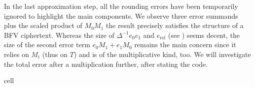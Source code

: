 \documentclass[letterpaper,10pt,english]{jupyterBook}
\begin{document}
\sphinxAtStartPar
In the last approximation step, all the rounding errors have been temporarily ignored to highlight the main components.
We observe three error summands plus the scaled product of \(M_0M_1\) \sphinxhyphen{} the result precisely satisfies the structure of a BFV ciphertext.
Whereas the size of \(\Delta^{-1}e_0e_1\) and \(e_{\text{rel}}\) (see {\hyperref[\detokenize{Thesis:relinearization-error}]{}}) seems decent, the size of the second error term \(e_0M_1+e_1M_0\) remains the main concern since it relies on \(M_i\) (thus on \(T\)) and is of the multiplicative kind, too.
We will investigate the total error after a multiplication further, after stating the code.

\begin{sphinxuseclass}{cell}\begin{sphinxVerbatimInput}


\end{sphinxVerbatimInput}
\end{sphinxuseclass}
\end{document}
